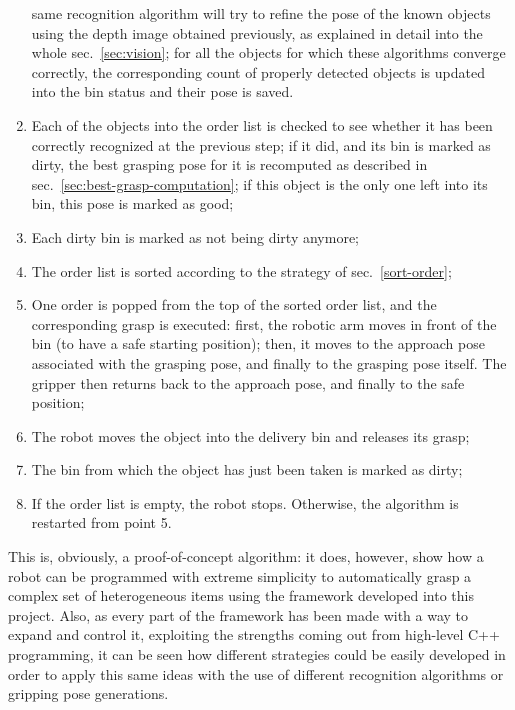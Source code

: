 \begin{enumerate}
{  same recognition algorithm will try to refine the pose of the known
  objects using the depth image obtained previously, as explained in
  detail into the whole sec.~\ref{sec:vision}; for all the objects for which
  these algorithms converge correctly, the corresponding count of
  properly detected objects is updated into the bin status and their
  pose is saved.}
\item{Each of the objects into the order list is checked to see
  whether it has been correctly recognized at the previous step; if it
did, and its bin is marked as dirty, the best grasping pose for it is
recomputed as described in sec.~\ref{sec:best-grasp-computation}; if
this object is the only one left into its bin, this pose is marked as good;}
\item{Each dirty bin is marked as not being dirty anymore;}
\item{The order list is sorted according to the strategy of
  sec.~\ref{sort-order};}
\item{One order is popped from the top of the sorted order list, and
  the corresponding grasp is executed: first, the robotic arm moves in
  front of the bin (to have a safe starting position); then, it moves
  to the approach pose associated with the grasping pose, and finally
  to the  grasping pose itself. The gripper then returns back to the
  approach pose, and finally to the safe position;}
\item{The robot moves the object into the delivery bin and releases its grasp;}
\item{The bin from which the object has just been taken is marked as
  dirty;}
\item{If the order list is empty, the robot stops. Otherwise, the
  algorithm is restarted from point 5.}
\end{enumerate}

This is, obviously, a proof-of-concept algorithm: it does, however,
show how a robot can be programmed with extreme simplicity to
automatically grasp a complex set of heterogeneous items using the
framework developed into this project. Also, as every part of the
framework has been made with a way to expand and control it,
exploiting the strengths coming out from high-level C++ programming,
it can be seen how different strategies could be easily developed in
order to apply this same ideas with the use of different recognition
algorithms or gripping pose generations.

